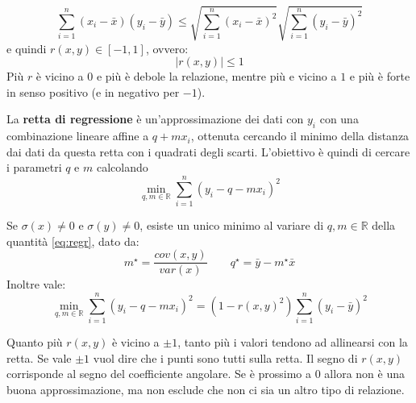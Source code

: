 \begin{proposition}
	\begin{equation}
		\sum_{i=1}^{n}(x_i - \bar{x})(y_i - \bar{y}) \leq \sqrt{\sum_{i=1}^{n}(x_i - \bar{x})^2}\sqrt{\sum_{i=1}^{n}(y_i - \bar{y})^2}
	\end{equation}
	e quindi $r(x,y) \in [-1,1]$, ovvero:
	\begin{equation}
		\lvert r(x,y)\rvert \leq 1
	\end{equation}
	Più $r$ è vicino a $0$ e più è debole la relazione, mentre più e vicino a $1$ e più è forte in senso positivo (e in negativo per $-1$).
\end{proposition}

La \textbf{retta di regressione} è un'approssimazione dei dati con $y_i$ con una combinazione lineare affine a $q + mx_i$, ottenuta cercando il minimo della distanza dai dati da questa retta con i quadrati degli scarti. L'obiettivo è quindi di cercare i parametri $q$ e $m$ calcolando
\begin{equation}
	\label{eq:regr}
	\min_{q,m \in \mathbb{R}} \sum_{i=1}^{n}(y_i-q-mx_i)^2
\end{equation}

\begin{theorem}
	Se $\sigma(x) \neq 0$ e $\sigma(y) \neq 0$, esiste un unico minimo al variare di $q,m \in \mathbb{R}$ della quantità \ref{eq:regr}, dato da:
	\begin{equation}
		m^\star = \frac{cov(x,y)}{var(x)} \quad\quad q^\star = \bar{y} - m^\star \bar{x}
	\end{equation}
	Inoltre vale:
	\begin{equation}
		\min_{q,m \in \mathbb{R}} \sum_{i=1}^{n}(y_i-q-mx_i)^2 = (1-r(x,y)^2)\sum_{i=1}^{n}(y_i - \bar{y})^2
	\end{equation}
\end{theorem}
Quanto più $r(x,y)$ è vicino a $\pm1$, tanto più i valori tendono ad allinearsi con la retta. Se vale $\pm1$ vuol dire che i punti sono tutti sulla retta. Il segno di $r(x,y)$ corrisponde al segno del coefficiente angolare. Se è prossimo a $0$ allora non è una buona approssimazione, ma non esclude che non ci sia un altro tipo di relazione.